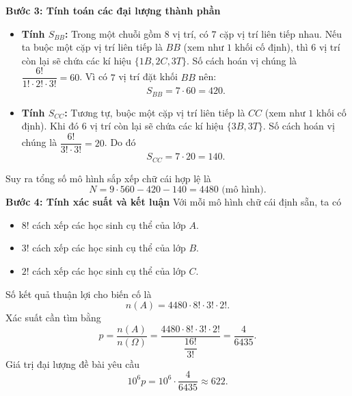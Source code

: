 \begin{ex}
{		\textbf{Bước 3: Tính toán các đại lượng thành phần}
		\begin{itemize}
			\item \textbf{Tính $S_{BB}$:} Trong một chuỗi gồm $8$ vị trí, có $7$ cặp vị trí liên tiếp nhau. Nếu ta buộc một cặp vị trí liên tiếp là $BB$ (xem như $1$ khối cố định), thì $6$ vị trí còn lại sẽ chứa các kí hiệu $\{1B, 2C, 3T\}$. Số cách hoán vị chúng là $\dfrac{6!}{1! \cdot 2! \cdot 3!} = 60$. Vì có $7$ vị trí đặt khối $BB$ nên:
			$$S_{BB} = 7 \cdot 60 = 420.$$
			\item \textbf{Tính $S_{CC}$:} Tương tự, buộc một cặp vị trí liên tiếp là $CC$ (xem như $1$ khối cố định). Khi đó $6$ vị trí còn lại sẽ chứa các kí hiệu $\{3B, 3T\}$. Số cách hoán vị chúng là $\dfrac{6!}{3! \cdot 3!} = 20$. Do đó
			$$S_{CC} = 7 \cdot 20 = 140.$$
		\end{itemize}
		Suy ra tổng số mô hình sắp xếp chữ cái hợp lệ là
		$$N = 9 \cdot 560 - 420 - 140 = 4480 \text{ (mô hình)}.$$
		\textbf{Bước 4: Tính xác suất và kết luận}
		Với mỗi mô hình chữ cái định sẵn, ta có
		\begin{itemize}
			\item $8!$ cách xếp các học sinh cụ thể của lớp $A$.
			\item $3!$ cách xếp các học sinh cụ thể của lớp $B$.
			\item $2!$ cách xếp các học sinh cụ thể của lớp $C$.
		\end{itemize}
		Số kết quả thuận lợi cho biến cố là
		$$n(A) = 4480 \cdot 8! \cdot 3! \cdot 2!.$$
		Xác suất cần tìm bằng
		$$p = \dfrac{n(A)}{n(\Omega)} = \dfrac{4480 \cdot 8! \cdot 3! \cdot 2!}{\dfrac{16!}{3!}} = \dfrac{4}{6435}.$$
		Giá trị đại lượng đề bài yêu cầu
		$$10^6p = 10^6 \cdot \dfrac{4}{6435} \approx 622.$$
	}
\end{ex}